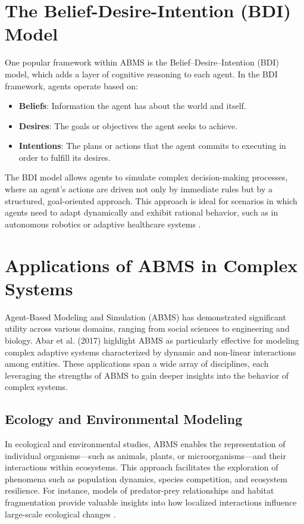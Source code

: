 \section{The Belief-Desire-Intention (BDI) Model}

One popular framework within ABMS is the Belief–Desire–Intention (BDI) model, which adds a layer of cognitive reasoning to each agent. In the BDI framework, agents operate based on:
\begin{itemize}
    \item \textbf{Beliefs}: Information the agent has about the world and itself.
    \item \textbf{Desires}: The goals or objectives the agent seeks to achieve.
    \item \textbf{Intentions}: The plans or actions that the agent commits to executing in order to fulfill its desires.
\end{itemize}

The BDI model allows agents to simulate complex decision-making processes, where an agent's actions are driven not only by immediate rules but by a structured, goal-oriented approach. This approach is ideal for scenarios in which agents need to adapt dynamically and exhibit rational behavior, such as in autonomous robotics or adaptive healthcare systems \cite{abar2017}.

\section{Applications of ABMS in Complex Systems}

Agent-Based Modeling and Simulation (ABMS) has demonstrated significant utility across various domains, ranging from social sciences to engineering and biology. Abar et al. (2017) highlight ABMS as particularly effective for modeling complex adaptive systems characterized by dynamic and non-linear interactions among entities. These applications span a wide array of disciplines, each leveraging the strengths of ABMS to gain deeper insights into the behavior of complex systems.

\subsection{Ecology and Environmental Modeling} In ecological and environmental studies, ABMS enables the representation of individual organisms—such as animals, plants, or microorganisms—and their interactions within ecosystems. This approach facilitates the exploration of phenomena such as population dynamics, species competition, and ecosystem resilience. For instance, models of predator-prey relationships and habitat fragmentation provide valuable insights into how localized interactions influence large-scale ecological changes \cite{abar2017}.

